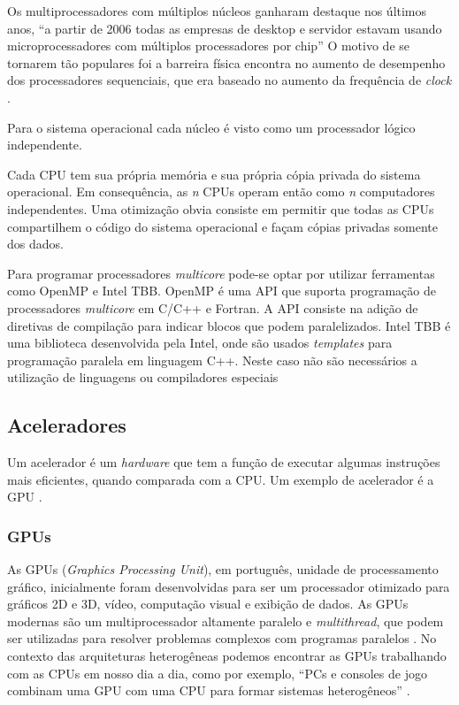 Os multiprocessadores com múltiplos núcleos ganharam destaque nos últimos anos, “a partir de 2006 todas as empresas de desktop e servidor estavam usando microprocessadores com múltiplos processadores por chip” \cite[p.~31]{hennessy2014organizaccao}
O motivo de se tornarem tão populares foi a barreira física encontra no aumento de desempenho dos processadores sequenciais, que era baseado no aumento da frequência de \textit{clock} \cite{hennessy2014organizaccao}.

Para o sistema operacional cada núcleo é visto como um processador lógico independente.

\begin{citacao}
Cada CPU tem sua própria memória e sua própria cópia privada do sistema operacional.
Em consequência, as \emph{n} CPUs operam então como \emph{n} computadores independentes.
Uma otimização obvia consiste em permitir que todas as CPUs compartilhem o código do sistema operacional e façam cópias privadas somente dos dados. \cite[p.~331]{tanenbaum20103a}
\end{citacao}

Para programar processadores \textit{multicore} pode-se optar por utilizar ferramentas como OpenMP e Intel TBB.
OpenMP é uma API que suporta programação de processadores \textit{multicore} em C/C++ e Fortran.
A API consiste na adição de diretivas de compilação para indicar blocos que podem paralelizados.
Intel TBB é uma biblioteca desenvolvida pela Intel, onde são usados \textit{templates} para programação paralela em linguagem C++.
Neste caso não são necessários a utilização de linguagens ou compiladores especiais

\subsection{Aceleradores}
Um acelerador é um \textit{hardware} que tem a função de executar algumas instruções mais eficientes,
quando comparada com a CPU. Um exemplo de acelerador é a GPU \cite{kindratenko2010high}.

\subsubsection{GPUs}
As GPUs (\textit{Graphics Processing Unit}), em português, unidade de processamento gráfico, inicialmente foram desenvolvidas para ser um processador otimizado para gráficos 2D e 3D, vídeo,
computação visual e exibição de dados.
As GPUs modernas são um multiprocessador altamente paralelo e \textit{multithread}, que podem ser utilizadas para resolver problemas complexos com programas paralelos \cite{hennessy2014organizaccao}.
No contexto das arquiteturas heterogêneas podemos encontrar as GPUs trabalhando com as CPUs em nosso dia a dia, como por exemplo,
“PCs e consoles de jogo combinam uma GPU com uma CPU para formar sistemas heterogêneos” \cite[p.~A-569]{hennessy2014organizaccao}.

